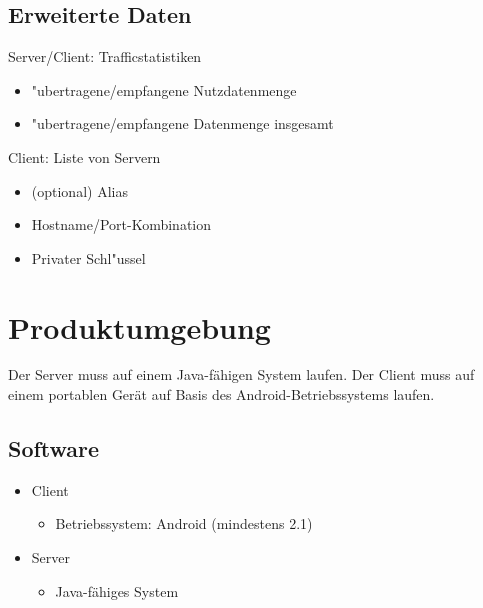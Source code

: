 \documentclass[a4paper,10pt]{scrartcl}
\begin{document}
\subsection{Erweiterte Daten}
\begin{usecase}
 {Server/Client: Trafficstatistiken
   \begin{itemize}
   \item "ubertragene/empfangene Nutzdatenmenge
   \item "ubertragene/empfangene Datenmenge insgesamt
   \end{itemize}
}
 {Client: Liste von Servern
   \begin{itemize}
   \item (optional) Alias
   \item Hostname/Port-Kombination
   \item Privater Schl"ussel
   \end{itemize}
}
\end{usecase}

\section{Produktumgebung}
Der Server muss auf einem Java-fähigen System laufen.
Der Client muss auf einem portablen Gerät auf Basis des Android-Betriebssystems laufen.
\subsection{Software}
\begin{itemize}
\item Client
   \begin{itemize}
      \item Betriebssystem: Android (mindestens 2.1)
   \end{itemize}
\item Server
   \begin{itemize}
      \item Java-fähiges System
   \end{itemize}
\end{itemize}
\end{document}
